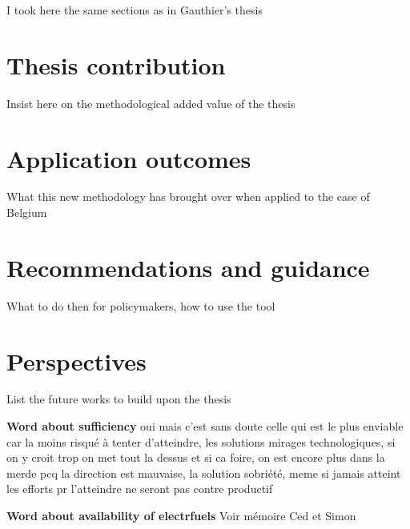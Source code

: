 I took here the same sections as in Gauthier's thesis
\section*{Thesis contribution}
Insist here on the methodological added value of the thesis

\section*{Application outcomes}
What this new methodology has brought over when applied to the case of Belgium

\section*{Recommendations and guidance}
What to do then for policymakers, how to use the tool

\section*{Perspectives}
List the future works to build upon the thesis

\textbf{Word about sufficiency} oui mais c'est sans doute celle qui est le plus enviable car la moins risqué à tenter d'atteindre, les solutions mirages technologiques, si on y croit trop on met tout la dessus et si ca foire, on est encore plus dans la merde pcq la direction est mauvaise, la solution sobriété, meme si jamais atteint les efforts pr l'atteindre ne seront pas contre productif

\textbf{Word about availability of electrfuels} Voir mémoire Ced et Simon